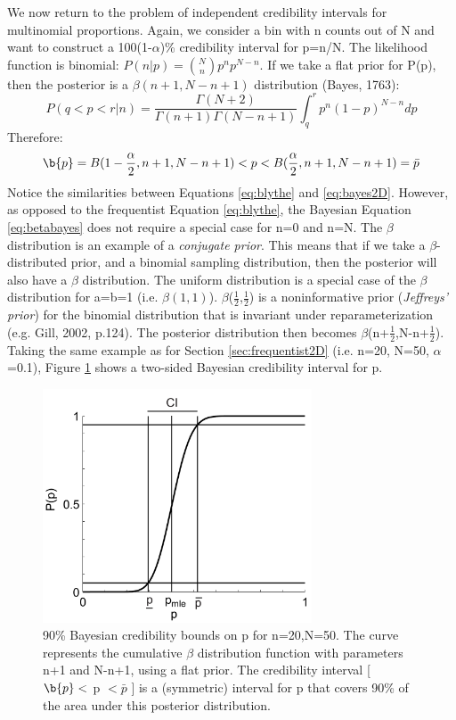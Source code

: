 \documentclass{article}
\begin{document}
We now return to the  problem of independent credibility intervals for
multinomial proportions. Again, we consider a bin with n counts out of
N and  want to construct a 100(1-$\alpha$)\%  credibility interval for
p=n/N.  The  likelihood function  is binomial: $P(n|p)  = \binom{N}{n}
p^n p^{N-n}$.  If we take a flat prior for P(p), then the posterior is
a $\beta(n+1,N-n+1)$ distribution (Bayes, 1763):
\begin{equation}
  \label{eq:betabayes}
  P(q<p<r | n) = \frac{\Gamma(N+2)}{\Gamma(n+1)\Gamma(N-n+1)}
                 \int_q^rp^{n}(1-p)^{N-n}dp
\end{equation}
Therefore:
\begin{equation}
  \label{eq:bayes2D}
 \b{p} = B(1-\frac{\alpha}{2},n+1,N-n+1)<p<B(\frac{\alpha}{2},n+1,N-n+1) = \bar{p}
\end{equation}
Notice   the  similarities   between  Equations   \ref{eq:blythe}  and
\ref{eq:bayes2D}.   However, as  opposed to  the  frequentist Equation
\ref{eq:blythe},  the Bayesian  Equation  \ref{eq:betabayes} does  not
require a special case for n=0 and n=N. The $\beta$ distribution is an
example of  a {\it  conjugate prior}.   This means that  if we  take a
$\beta$-distributed prior, and  a binomial sampling distribution, then
the  posterior will  also have  a $\beta$  distribution.   The uniform
distribution is a  special case of the $\beta$  distribution for a=b=1
(i.e.    $\beta(1,1)$).   $\beta$($\frac{1}{2}$,$\frac{1}{2}$)   is  a
noninformative  prior   ({\it  Jeffreys'  prior})   for  the  binomial
distribution that  is invariant under  reparameterization (e.g.  Gill,
2002,    p.124).    The    posterior    distribution   then    becomes
$\beta$(n+$\frac{1}{2}$,N-n+$\frac{1}{2}$).   Taking the  same example
as   for   Section    \ref{sec:frequentist2D}   (i.e.    n=20,   N=50,
$\alpha$=0.1), Figure \ref{fig:Bayesian2D}  shows a two-sided Bayesian
credibility interval for p.
\begin{figure}[here]
  \centering
  \includegraphics[width=8cm]{3.pdf}
  \caption{90\% Bayesian credibility bounds on p for n=20,N=50. The 
curve  represents the  cumulative $\beta$  distribution  function with
parameters n+1 and N-n+1, using a flat prior. The credibility interval
[  $\b{p} <$ p  $< \bar{p}$  ] is  a (symmetric)  interval for  p that
covers 90\% of the area under this posterior distribution.}
  \label{fig:Bayesian2D}
\end{figure}
\end{document}

